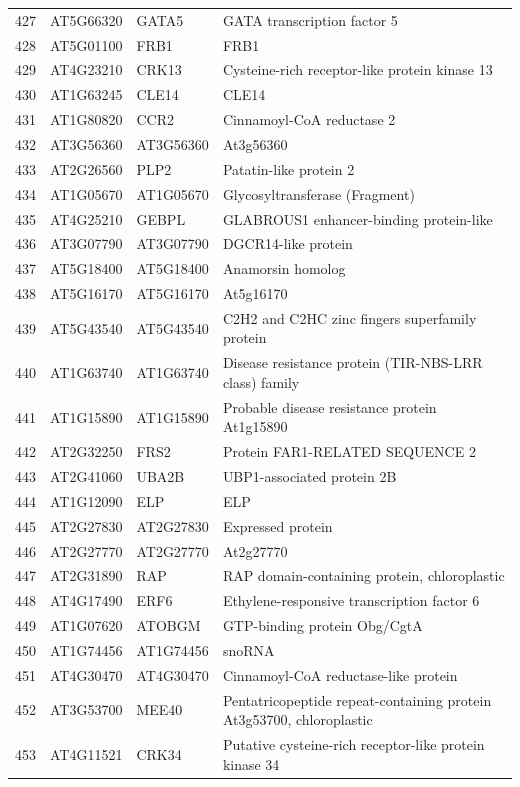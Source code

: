 \documentclass[11pt]{article}
\begin{document}
\begin{center}
\begin{tabular}{rlll}
427 & AT5G66320 & GATA5 & GATA transcription factor 5\\
428 & AT5G01100 & FRB1 & FRB1\\
429 & AT4G23210 & CRK13 & Cysteine-rich receptor-like protein kinase 13\\
430 & AT1G63245 & CLE14 & CLE14\\
431 & AT1G80820 & CCR2 & Cinnamoyl-CoA reductase 2\\
432 & AT3G56360 & AT3G56360 & At3g56360\\
433 & AT2G26560 & PLP2 & Patatin-like protein 2\\
434 & AT1G05670 & AT1G05670 & Glycosyltransferase (Fragment)\\
435 & AT4G25210 & GEBPL & GLABROUS1 enhancer-binding protein-like\\
436 & AT3G07790 & AT3G07790 & DGCR14-like protein\\
437 & AT5G18400 & AT5G18400 & Anamorsin homolog\\
438 & AT5G16170 & AT5G16170 & At5g16170\\
439 & AT5G43540 & AT5G43540 & C2H2 and C2HC zinc fingers superfamily protein\\
440 & AT1G63740 & AT1G63740 & Disease resistance protein (TIR-NBS-LRR class) family\\
441 & AT1G15890 & AT1G15890 & Probable disease resistance protein At1g15890\\
442 & AT2G32250 & FRS2 & Protein FAR1-RELATED SEQUENCE 2\\
443 & AT2G41060 & UBA2B & UBP1-associated protein 2B\\
444 & AT1G12090 & ELP & ELP\\
445 & AT2G27830 & AT2G27830 & Expressed protein\\
446 & AT2G27770 & AT2G27770 & At2g27770\\
447 & AT2G31890 & RAP & RAP domain-containing protein, chloroplastic\\
448 & AT4G17490 & ERF6 & Ethylene-responsive transcription factor 6\\
449 & AT1G07620 & ATOBGM & GTP-binding protein Obg/CgtA\\
450 & AT1G74456 & AT1G74456 & snoRNA\\
451 & AT4G30470 & AT4G30470 & Cinnamoyl-CoA reductase-like protein\\
452 & AT3G53700 & MEE40 & Pentatricopeptide repeat-containing protein At3g53700, chloroplastic\\
453 & AT4G11521 & CRK34 & Putative cysteine-rich receptor-like protein kinase 34\\

\end{tabular}
\end{center}
\end{document}
